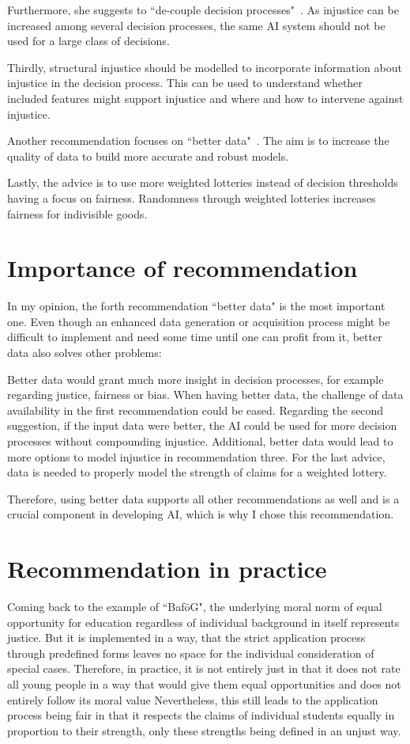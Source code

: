 Furthermore, she suggests to ``de-couple decision processes"~\parencite[][22]{vredenburgh}.
As injustice can be increased among several decision processes, the same AI system should not be used for a large class of decisions.

Thirdly, structural injustice should be modelled to incorporate information about injustice in the decision process.
This can be used to understand whether included features might support injustice and where and how to intervene against injustice.

Another recommendation focuses on ``better data"~\parencite[][24]{vredenburgh}.
The aim is to increase the quality of data to build more accurate and robust models.

Lastly, the advice is to use more weighted lotteries instead of decision thresholds having a focus on fairness.
Randomness through weighted lotteries increases fairness for indivisible goods.

\section*{Importance of recommendation}

In my opinion, the forth recommendation ``better data" is the most important one.
Even though an enhanced data generation or acquisition process might be difficult to implement and need some time until one can profit from it, better data also solves other problems:

Better data would grant much more insight in decision processes, for example regarding justice, fairness or bias.
When having better data, the challenge of data availability in the first recommendation could be eased.
Regarding the second suggestion, if the input data were better, the AI could be used for more decision processes without compounding injustice.
Additional, better data would lead to more options to model injustice in recommendation three.
For the last advice, data is needed to properly model the strength of claims for a weighted lottery.

Therefore, using better data supports all other recommendations as well and is a crucial component in developing AI, which is why I chose this recommendation.

\section*{Recommendation in practice}

Coming back to the example of ``BaföG", the underlying moral norm of equal opportunity for education regardless of individual background in itself represents justice.
But it is implemented in a way, that the strict application process through predefined forms leaves no space for the individual consideration of special cases.
Therefore, in practice, it is not entirely just in that it does not rate all young people in a way that would give them equal opportunities and does not entirely follow its moral value
Nevertheless, this still leads to the application process being fair in that it respects the claims of individual students equally in proportion to their strength, only these strengths being defined in an unjust way.

